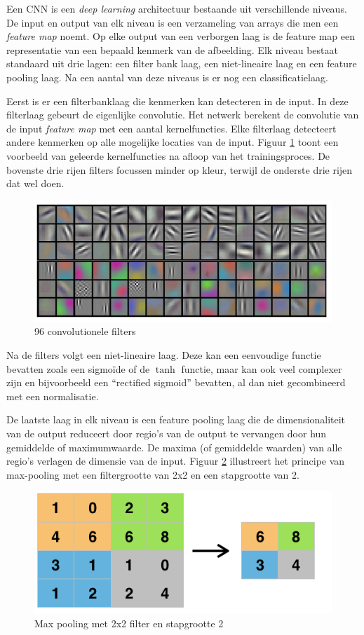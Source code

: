 Een CNN is een \emph{deep learning} architectuur bestaande uit verschillende niveaus. De input en output van elk niveau is een verzameling van arrays die men een \emph{feature map} noemt. Op elke output van een verborgen laag is de feature map een representatie van een bepaald kenmerk van de afbeelding. Elk niveau bestaat standaard uit drie lagen: een filter bank laag, een niet-lineaire laag en een feature pooling laag. Na een aantal van deze niveaus is er nog een classificatielaag.

Eerst is er een filterbanklaag die kenmerken kan detecteren in de input. In deze filterlaag gebeurt de eigenlijke convolutie. Het netwerk berekent de convolutie van de input \emph{feature map} met een aantal kernelfuncties. Elke filterlaag detecteert andere kenmerken op alle mogelijke locaties van de input. Figuur \ref{fig:cnnfilters} toont een voorbeeld van geleerde kernelfuncties na afloop van het trainingsproces. De bovenste drie rijen filters focussen minder op kleur, terwijl de onderste drie rijen dat wel doen.

\begin{figure}[tb]
    \centering
    \includegraphics[width=.7\textwidth]{Images/cnnfilters.png}
    \caption{96 convolutionele filters\cite{Krizhevsky2012a}}
    \label{fig:cnnfilters}
\end{figure}

Na de filters volgt een niet-lineaire laag. Deze kan een eenvoudige functie bevatten zoals een sigmo\"ide of de $\tanh$ functie, maar kan ook veel complexer zijn en bijvoorbeeld een ``rectified sigmoid'' bevatten, al dan niet gecombineerd met een normalisatie.

De laatste laag in elk niveau is een feature pooling laag die de dimensionaliteit van de output reduceert door regio's van de output te vervangen door hun gemiddelde of maximumwaarde. De maxima (of gemiddelde waarden) van alle regio's verlagen de dimensie van de input. Figuur \ref{fig:maxpool} illustreert het principe van max-pooling met een filtergrootte van 2x2 en een stapgrootte van 2. 

\begin{figure}[tb]
    \centering
    \includegraphics[width=0.6\linewidth]{Images/maxpool.png}
    \caption{Max pooling met 2x2 filter en stapgrootte 2}
    \label{fig:maxpool}
\end{figure}

